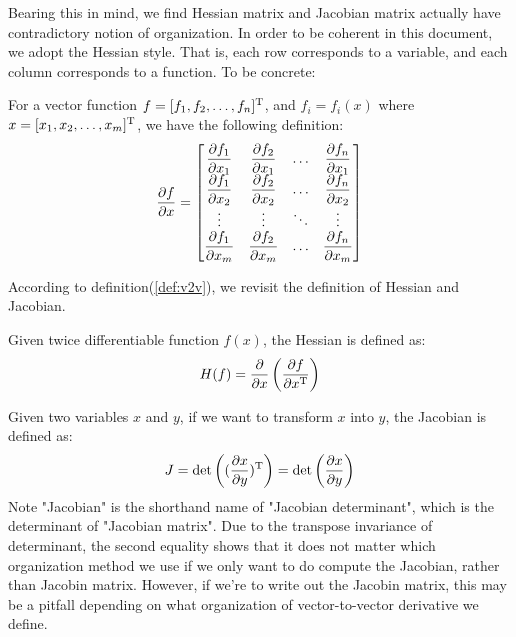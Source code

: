 Bearing this in mind, we find Hessian matrix and Jacobian matrix actually have 
contradictory notion of organization. In order to be coherent in 
this document, we adopt the Hessian style. That is, each row
corresponds to a variable, and each column corresponds to a function. 
To be concrete:

\begin{mydef}
\label{def:v2v}
For a vector function $f = [f_1, f_2, \ldots, f_n]^\mathrm{T}$, and 
$f_i=f_i(x)$ where $x=[x_1, x_2, \ldots, x_m]^\mathrm{T}$, 
we have the following definition:
\begin{equation}
	\dfrac{\partial f}{\partial x} = \left[
	\begin{matrix}
			\dfrac{\partial f_1}{\partial x_{1}} & \dfrac{\partial f_2}{\partial x_{1}} & \ldots &\dfrac{\partial f_n}{\partial x_{1}}\\
			\dfrac{\partial f_1}{\partial x_{2}} & \dfrac{\partial f_2}{\partial x_{2}} & \ldots &\dfrac{\partial f_n}{\partial x_{2}}\\
			\vdots & \vdots & \ddots & \vdots \\
			\dfrac{\partial f_1}{\partial x_{m}} & \dfrac{\partial f_2}{\partial x_{m}} & \ldots &\dfrac{\partial f_n}{\partial x_{m}}\\
	\end{matrix}
	\right]
\end{equation}
\end{mydef}

\begin{myex}
According to definition(\ref{def:v2v}), we revisit the definition of Hessian 
and Jacobian. 

Given twice differentiable function $f(x)$, the Hessian is defined as:
\begin{equation}
	H(f) = \dfrac{\partial }{\partial x}\left(\dfrac{\partial f}{\partial x^\mathrm{T}}\right)	
\end{equation}

Given two variables $x$ and $y$, if we want to transform $x$ into $y$, 
the Jacobian is defined as:
\begin{equation}
	J = \det \left((\dfrac{\partial x}{\partial y})^\mathrm{T}\right) = 
	\det \left(\dfrac{\partial x}{\partial y}\right)
\end{equation}
Note "Jacobian" is the shorthand name of "Jacobian determinant", 
which is the determinant of "Jacobian matrix". Due to the transpose 
invariance of determinant, the second equality shows that it does not
matter which organization method we use if we only want to do 
compute the Jacobian, rather than Jacobin matrix. However, 
if we're to write out the Jacobin matrix, this may be a pitfall 
depending on what organization of vector-to-vector derivative we define. 
\end{myex}

